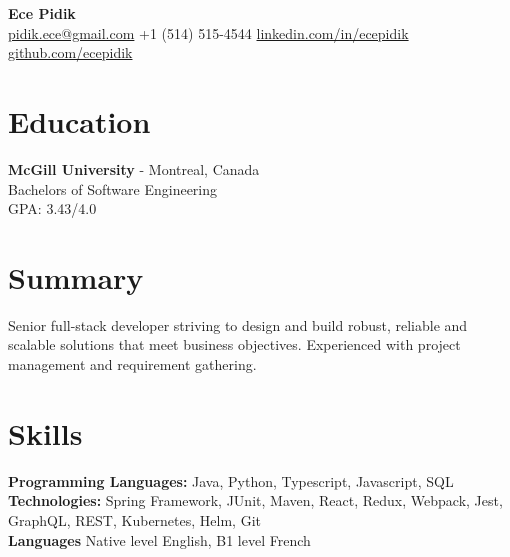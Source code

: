 \documentclass[a4paper,10pt]{article}
\begin{document}
\begin{center}
    {\fontsize{18}{18}\textbf{Ece Pidik}\selectfont} \\
    \vspace{0.3em}
    \href{mailto:pidik.ece@gmail.com}{pidik.ece@gmail.com} \textbullet{} 
    +1 (514) 515-4544 \textbullet{} 
    \href{https://www.linkedin.com/in/ecepidik}{linkedin.com/in/ecepidik} \textbullet{} 
    \href{github.com/ecepidik}{github.com/ecepidik}
\end{center}

\vspace{-0.4cm}
\noindent
\begin{minipage}[t]{0.38\textwidth}
    \section*{Education}
    \noindent
    \textbf {\large McGill University} - Montreal, Canada \\
    Bachelors of Software Engineering\\
    GPA: 3.43/4.0
\end{minipage}%
\hfill
\begin{minipage}[t]{0.58\textwidth}
    \section*{Summary}
    \noindent
    Senior full-stack developer striving to design and build robust, reliable and scalable solutions that meet business objectives. Experienced with project management and requirement gathering.
\end{minipage}

\vspace{-0.2cm}
\section*{Skills}
\noindent
\textbf{Programming Languages:} Java, Python, Typescript, Javascript, SQL \\
\textbf{Technologies:} Spring Framework, JUnit, Maven, React, Redux, Webpack, Jest, GraphQL, REST, Kubernetes, Helm, Git \\
\textbf{Languages}
Native level English,
B1 level French

\vspace{-0.2cm}
\end{document}
